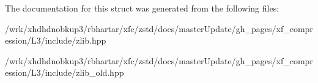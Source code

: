 The documentation for this struct was generated from the following files\-:\begin{DoxyCompactItemize}
\item 
/wrk/xhdhdnobkup3/rbhartar/xfc/zstd/docs/master\-Update/gh\-\_\-pages/xf\-\_\-compression/\-L3/include/zlib.\-hpp\item 
/wrk/xhdhdnobkup3/rbhartar/xfc/zstd/docs/master\-Update/gh\-\_\-pages/xf\-\_\-compression/\-L3/include/zlib\-\_\-old.\-hpp\end{DoxyCompactItemize}
